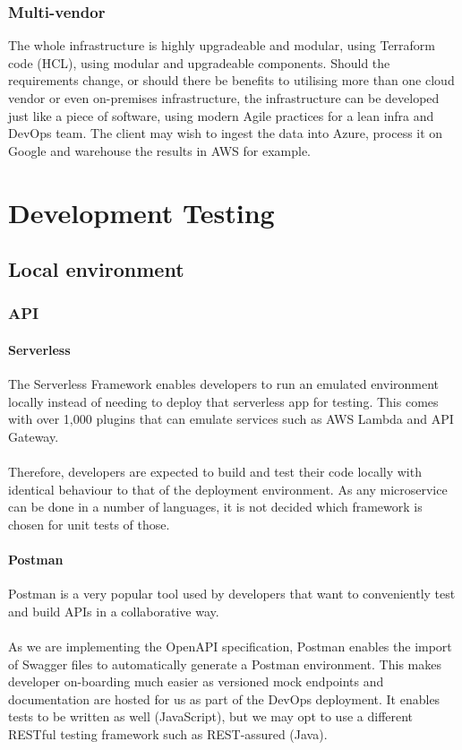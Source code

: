\documentclass[10pt]{article}
\begin{document}
\subsubsection{Multi-vendor}
The whole infrastructure is highly upgradeable and modular, using Terraform code (HCL), using modular and upgradeable components. Should the requirements change, or should there be benefits to utilising more than one cloud vendor or even on-premises infrastructure, the infrastructure can be developed just like a piece of software, using modern Agile practices for a lean infra and DevOps team. The client may wish to ingest the data into Azure, process it on Google and warehouse the results in AWS for example.

\newpage
\section{Development Testing}
\subsection{Local environment}

\subsubsection{API}
\paragraph{Serverless}
The Serverless Framework enables developers to run an emulated environment locally instead of needing to deploy that serverless app for testing. This comes with over 1,000 plugins that can emulate services such as AWS Lambda and API Gateway. 
\\ \\
Therefore, developers are expected to build and test their code locally with identical behaviour to that of the deployment environment. As any microservice can be done in a number of languages, it is not decided which framework is chosen for unit tests of those.
\paragraph{Postman}

Postman is a very popular tool used by developers that want to conveniently test and build APIs in a collaborative way.
\\ \\
As we are implementing the OpenAPI specification, Postman enables the import of Swagger files to automatically generate a Postman environment. This makes developer on-boarding much easier as versioned mock endpoints and documentation are hosted for us as part of the DevOps deployment. It enables tests to be written as well (JavaScript), but we may opt to use a different RESTful testing framework such as REST-assured (Java).
\end{document}

